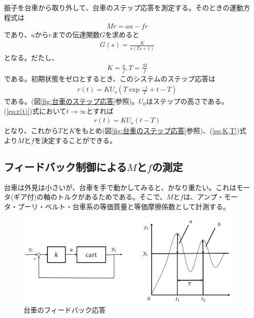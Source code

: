 \documentclass[a4j,11pt,twoside]{ujbook}
\begin{document}
振子を台車から取り外して、台車のステップ応答を測定する。そのときの運動方程式は
\begin{eqnarray}
	M\ddot{r} = au - fr
\end{eqnarray}
であり、$u$から$r$までの伝達関数$G$を求めると
\begin{eqnarray}
	G(s) = \frac{K}{s(Ts+1)}
\end{eqnarray}
となる。だたし、
\begin{eqnarray}
K = \frac{a}{f},T = \frac{M}{f}
\label{eq:K,T}
\end{eqnarray}
である。初期状態をゼロとするとき、このシステムのステップ応答は
\begin{eqnarray}
r(t) = KU_o(T\exp{\frac{-t}{T}}+t-T)
\label{eq:r(t)}
\end{eqnarray}
である。(図\ref{fig:台車のステップ応答}参照)。$U_0$はステップの高さである。(\ref{eq:r(t)})式において$t→∞$とすれば
\begin{eqnarray}
r(t) = KU_o(t-T)
\end{eqnarray}
となり、これから$T$と$K$をもとめ(図\ref{fig:台車のステップ応答}参照)、(\ref{eq:K,T})式より$M$と$f$を決定することができる。

\subsection{フィードバック制御による$M$と$f$の測定}
台車は外見は小さいが、台車を手で動かしてみると、かなり重たい。これはモータ(ギア付)の軸のトルクがあるためである。そこで、$M$と$f$は、アンプ・モータ・プーリ・ベルト・台車系の等価質量と等価摩擦係数として計測する。

\begin{figure}[htbp]
	\begin{center}
		\includegraphics[width = 1.0 \linewidth]{feedback.eps}
		\caption{台車のフィードバック応答}
		\label{fig:台車のフィードバック応答}
	\end{center}
\end{figure}
\end{document}
